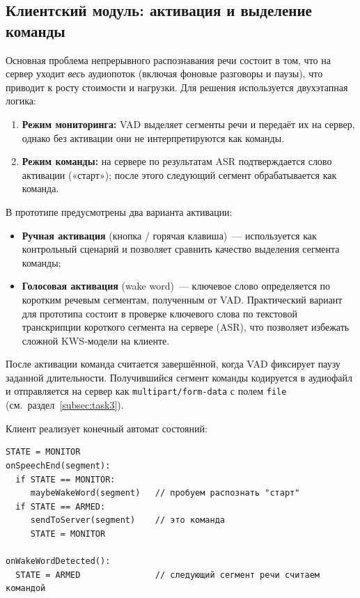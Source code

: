\subsection{Клиентский модуль: активация и выделение команды}
\label{subsec:task2}

Основная проблема непрерывного распознавания речи состоит в том, что на сервер уходит \emph{весь} аудиопоток (включая фоновые разговоры и паузы), что приводит к росту стоимости и нагрузки.
Для решения используется двухэтапная логика:
\begin{enumerate}
    \item \textbf{Режим мониторинга:} VAD выделяет сегменты речи и передаёт их на сервер, однако без активации они не интерпретируются как команды.
    \item \textbf{Режим команды:} на сервере по результатам ASR подтверждается слово активации («старт»); после этого следующий сегмент обрабатывается как команда.
\end{enumerate}

В прототипе предусмотрены два варианта активации:
\begin{itemize}
    \item \textbf{Ручная активация} (кнопка / горячая клавиша)~--- используется как контрольный сценарий и позволяет сравнить качество выделения сегмента команды;
    \item \textbf{Голосовая активация} (wake word)~--- ключевое слово определяется по коротким речевым сегментам, полученным от VAD. Практический вариант для прототипа состоит в проверке ключевого слова по текстовой транскрипции короткого сегмента на сервере (ASR), что позволяет избежать сложной KWS‑модели на клиенте.
\end{itemize}

После активации команда считается завершённой, когда VAD фиксирует паузу заданной длительности.
Получившийся сегмент команды кодируется в аудиофайл и отправляется на сервер как \texttt{multipart/form-data} с полем \texttt{file} (см.~раздел~\ref{subsec:task3}).

Клиент реализует конечный автомат состояний:

\begin{verbatim}
STATE = MONITOR
onSpeechEnd(segment):
  if STATE == MONITOR:
     maybeWakeWord(segment)   // пробуем распознать "старт"
  if STATE == ARMED:
     sendToServer(segment)    // это команда
     STATE = MONITOR

onWakeWordDetected():
  STATE = ARMED               // следующий сегмент речи считаем командой
\end{verbatim}

